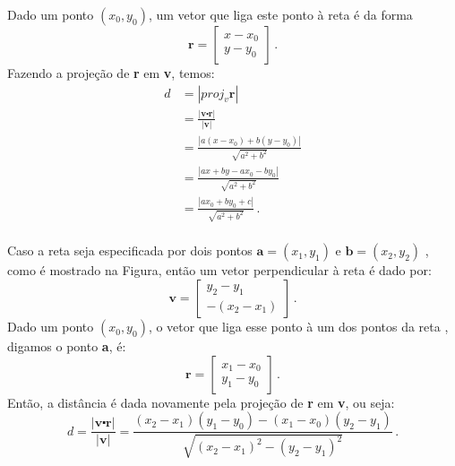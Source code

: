 Dado um ponto $(x_0, y_0)$, um vetor que liga este ponto à reta é da forma
\begin{equation*}
\textbf{r}=\left[ \begin{array}{c} x-x_0\\ y-y_0 \end{array} \right]\,.
\end{equation*}
Fazendo a projeção de \textbf{r} em \textbf{v}, temos:
\begin{equation*}
\begin{aligned}
d&=|proj_v\textbf{r}| \\
&=\frac{|\textbf{v}\centerdot \textbf{r}|}{|\textbf{v}|} \\
&=\frac{|a(x-x_0)+b(y-y_0)|}{\sqrt{a^2+b^2}} \\
&=\frac{|ax+by-ax_0-by_0|}{\sqrt{a^2+b^2}} \\
&=\frac{|ax_0+by_0+c|}{\sqrt{a^2+b^2}}\,. \\
\end{aligned}
\end{equation*}

Caso a reta seja especificada por dois pontos $\textbf{a}=(x_1, y_1)$ e
$\textbf{b}=(x_2, y_2)$ , como é mostrado na Figura, então um vetor
perpendicular à reta é dado por:
\begin{equation*}
\textbf{v}=\left[ \begin{array}{c} y_2-y_1 \\ -(x_2-x_1) \end{array}\right] \,.
\end{equation*}
Dado um ponto $(x_0, y_0)$, o vetor que liga esse ponto à um dos pontos da reta
, digamos o ponto \textbf{a}, é:
\begin{equation*}
\textbf{r}=\left[ \begin{array}{c} x_1-x_0 \\ y_1-y_0\end{array}\right] \,.
\end{equation*}
Então, a distância é dada novamente pela projeção de \textbf{r} em \textbf{v},
ou seja:
\begin{equation*}
d =\frac{|\textbf{v}\centerdot \textbf{r}|}{|\textbf{v}|} =
\frac{(x_2-x_1)(y_1-y_0)-(x_1-x_0)(y_2-y_1)}{\sqrt{(x_2-x_1)^2-(y_2-y_1)^2}}\,.
\end{equation*}